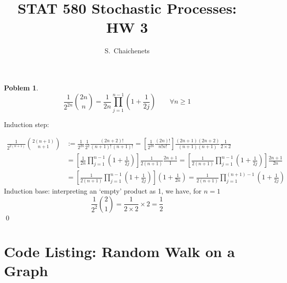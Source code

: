\documentclass[8pt,notitlepage]{report}
\newtheorem{problem}{Poblem}
\newenvironment{solution}[1][Solution]{\begin{trivlist}
    \item[\hskip \labelsep {\bfseries #1}]}{\end{trivlist}}
\begin{document}
\title{STAT 580 Stochastic Processes: HW 3}
\author{ S.\ Chaichenets }
\maketitle



\begin{problem}
\small
\begin{equation}
\frac{1}{2^{2n}} {2n \choose n} = \frac{1}{2n} \prod_{j=1}^{n-1} \left(1+\frac{1}{2j}\right)
\qquad \forall n\geq 1
\end{equation}
\normalsize
\end{problem}

\begin{solution}
Induction step:

\begin{equation}
\begin{split}
\frac{1}{2^{2(n+1)}} {2(n+1) \choose n+1} 
	& := \frac{1}{2^{2n}}\frac{1}{2^2} \frac{(2n+2)!}{(n+1)!\,(n+1)!} 
	 = \left[ \frac{1}{2^{2n}}\frac{(2n)!}{n!n!} \right]
		\frac{(2n+1)(2n+2)}{(n+1)(n+1)}\frac{1}{2\times2} 			\\
	& = \left[ \frac{1}{2n}\prod_{j=1}^{n-1} \left(1+\frac{1}{2j}\right) \right]
		\frac{1}{2(n+1)}\frac{2n+1}{1} 
	 = \left[ \frac{1}{2(n+1)}\prod_{j=1}^{n-1} \left(1+\frac{1}{2j}\right) \right]
		\frac{2n+1}{2n}								\\
	& = \left[ \frac{1}{2(n+1)}\prod_{j=1}^{n-1} \left(1+\frac{1}{2j}\right) \right]
		\left( 1 + \frac{1}{2n} \right)
	 = \frac{1}{2(n+1)}\prod_{j=1}^{(n+1)-1} \left(1+\frac{1}{2j}\right)
\end{split}
\end{equation}
Induction base: interpreting an `empty' product as 1, we have, for $n=1$
$$
\frac{1}{2^2}{2 \choose 1} = \frac{1}{2\times2} \times 2 = \frac{1}{2}
$$
\qed
\end{solution}

\newpage
\appendix
\section*{Code Listing: Random Walk on a Graph}

\end{document}
